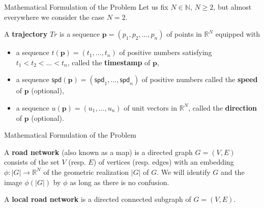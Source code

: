 \documentclass[aspectratio=169, bigfiles, professionalfonts, hyperref={colorlinks=true, allcolors=., urlcolor=blue}]{beamer}
\newcommand{\R}{\mathbb{R}}
\newcommand{\spd}{\mathsf{spd}}
\begin{document}
\begin{frame}{Mathematical Formulation of the Problem}
Let us fix $N\in\mathbb{N}$, $N\geq2$, but almost everywhere we consider the case $N = 2$.
\begin{definition}[Trajectory] \label{Tr}
A \textbf{trajectory} $Tr$ is a sequence $\mathbf{p} = (p_1,p_2,\dots, p_n)$ of points in $\R^N$ equipped with
\begin{itemize}
    \item a sequence $t(\mathbf{p}) = (t_1,\dots,t_{n})$ of positive numbers satisfying $t_1<t_2<\dots <t_n$, called the \textbf{timestamp} of $\mathbf{p}$,
    \item a sequence ${\spd}(\mathbf{p}) = ({\spd}_1,\dots,{\spd}_{n})$ of positive numbers called the \textbf{speed} of $\mathbf{p}$ (optional),
    \item a sequence $u(\mathbf{p}) = (u_1, \dots, u_n)$ of unit vectors in $\R^{N}$, called the \textbf{direction} of $\mathbf{p}$ (optional).
\end{itemize}
\end{definition}
\end{frame}



\begin{frame}{Mathematical Formulation of the Problem}
\begin{definition} \label{def:road-network}
A  \textbf{road network} (also known as a map) is a directed graph $G=(V,E)$ consists of the set $V$ (resp. $E$) of vertices (resp. edges) with an embedding $\phi:|G|\rightarrow\mathbb{R}^N$ of the geometric realization $|G|$ of $G$.
We will identify $G$ and the image $\phi(|G|)$ by $\phi$ as long as there is no confusion.
\end{definition}
\begin{definition} \label{def:local-road-network}
A  \textbf{local road network} is a directed connected subgraph of $G=(V,E)$.
\end{definition}
\end{frame}
\end{document}
